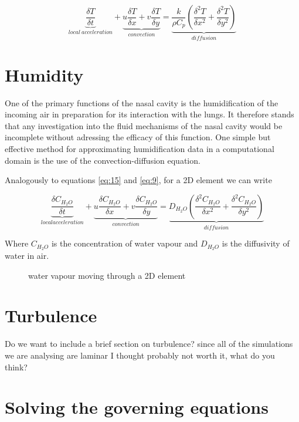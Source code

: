     \begin{equation} \label{eq:15}
      \underbrace{\frac{\delta T}{\delta t}}_{local\ acceleration} + \underbrace{u \frac{\delta T}{\delta x} + v \frac{\delta T}{\delta y}}_{convection} = \underbrace{\frac{k}{\rho C_{p}} ( \frac{\delta^2 T}{\delta x^2} + \frac{\delta^2 T}{\delta y^2} )}_{diffusion}
    \end{equation}

\section{Humidity}

One of the primary functions of the nasal cavity is the humidification of the incoming air in preparation for its interaction with the lungs. It therefore stands that any investigation into the fluid mechanisms of the nasal cavity would be incomplete without adressing the efficacy of this function. One simple but effective method for approximating humidification data in a computational domain is the use of the convection-diffusion equation.

Analogously to equations \ref{eq:15} and \ref{eq:9}, for a 2D element we can write

\begin{equation} \label{eq:16}
  \underbrace{\frac{\delta C_{H_{2} O}}{\delta t}}_{local acceleration} + \underbrace{u \frac{\delta C_{H_{2} O}}{\delta x} + v \frac{\delta C_{H_{2} O}}{\delta y}}_{convection} = \underbrace{D_{H_{2} O} ( \frac{\delta^2 C_{H_{2} O}}{\delta x^2} + \frac{\delta^2 C_{H_{2} O}}{\delta y^2} )}_{diffusion}
\end{equation} \nocite{Naftali1998}

Where $C_{H_{2} O}$ is the concentration of water vapour and $D_{H_{2} O}$ is the diffusivity of water in air.

\begin{figure} \label{fig:h2oel}
  \caption{water vapour moving through a 2D element}
\end{figure}

\section{Turbulence}
Do we want to include a brief section on turbulence? since all of the simulations we are analysing are laminar I thought probably not worth it, what do you think?
\section{Solving the governing equations}

